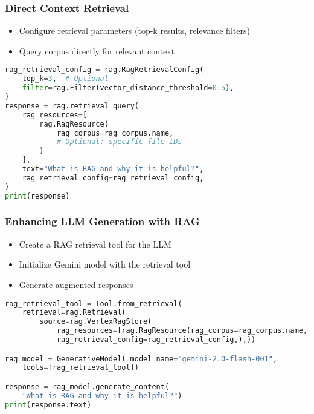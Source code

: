 \begin{frame}[fragile]\frametitle{Direct Context Retrieval}
      \begin{itemize}
        \item Configure retrieval parameters (top-k results, relevance filters)
        \item Query corpus directly for relevant context
      \end{itemize}
		
        \begin{lstlisting}[language=python]
rag_retrieval_config = rag.RagRetrievalConfig(
    top_k=3,  # Optional
    filter=rag.Filter(vector_distance_threshold=0.5),
)
response = rag.retrieval_query(
    rag_resources=[
        rag.RagResource(
            rag_corpus=rag_corpus.name,
            # Optional: specific file IDs
        )
    ],
    text="What is RAG and why it is helpful?",
    rag_retrieval_config=rag_retrieval_config,
)
print(response)
        \end{lstlisting}
\end{frame}

\begin{frame}[fragile]\frametitle{Enhancing LLM Generation with RAG}
      \begin{itemize}
        \item Create a RAG retrieval tool for the LLM
        \item Initialize Gemini model with the retrieval tool
        \item Generate augmented responses
      \end{itemize}
		
      \begin{lstlisting}[language=python]
rag_retrieval_tool = Tool.from_retrieval(
    retrieval=rag.Retrieval(
        source=rag.VertexRagStore(
            rag_resources=[rag.RagResource(rag_corpus=rag_corpus.name,)],
            rag_retrieval_config=rag_retrieval_config,),))

rag_model = GenerativeModel( model_name="gemini-2.0-flash-001", 
    tools=[rag_retrieval_tool])

response = rag_model.generate_content(
    "What is RAG and why it is helpful?")
print(response.text)
      \end{lstlisting}
\end{frame}

